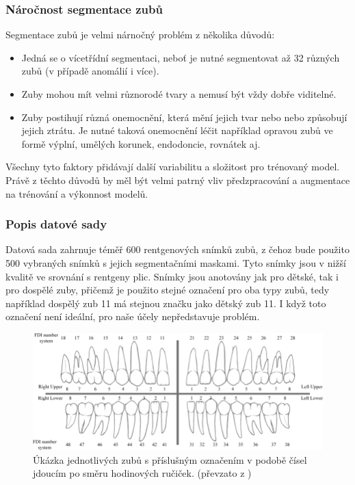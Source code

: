 \documentclass[male,czech,api_ing]{thesis}
\begin{document}
\subsubsection{Náročnost segmentace zubů}
Segmentace zubů je velmi nárnočný problém z několika důvodů:

\begin{itemize}
    \item Jedná se o vícetřídní segmentaci, neboť je nutné segmentovat až 32 různých zubů (v případě anomálií i více).
    \item Zuby mohou mít velmi různorodé tvary a nemusí být vždy dobře viditelné.
    \item Zuby postihují různá onemocnění, která mění jejich tvar nebo nebo způsobují jejich ztrátu. Je nutné taková onemocnění léčit například opravou zubů ve formě výplní, umělých korunek, endodoncie, rovnátek aj.
\end{itemize}

Všechny tyto faktory přidávají další variabilitu a složitost pro trénovaný model. Právě z těchto důvodů by měl být velmi patrný vliv předzpracování a augmentace na trénování a výkonnost modelů.

\subsubsection{Popis datové sady}
Datová sada zahrnuje téměř 600 rentgenových snímků zubů, z čehoz bude použito 500 vybraných snímků s jejich segmentačními maskami. Tyto snímky jsou v nižší kvalitě ve srovnání s rentgeny plic. Snímky jsou anotovány jak pro dětské, tak i pro dospělé zuby, přičemž je použito stejné označení pro oba typy zubů, tedy například dospělý zub 11 má stejnou značku jako dětský zub 11. I když toto označení není ideální, pro naše účely nepředstavuje problém.

\begin{figure}[ht]
    \centering
    \includegraphics[width=\linewidth]{Prilohy/Obrazky/FDITeethLabels.png}
    \caption{Úkázka jednotlivých zubů s příslušným označením v podobě čísel jdoucím po směru hodinových ručiček. (převzato z \cite{teethLabelImg})}
    \label{fig:teethLabel}
\end{figure}
\end{document}

